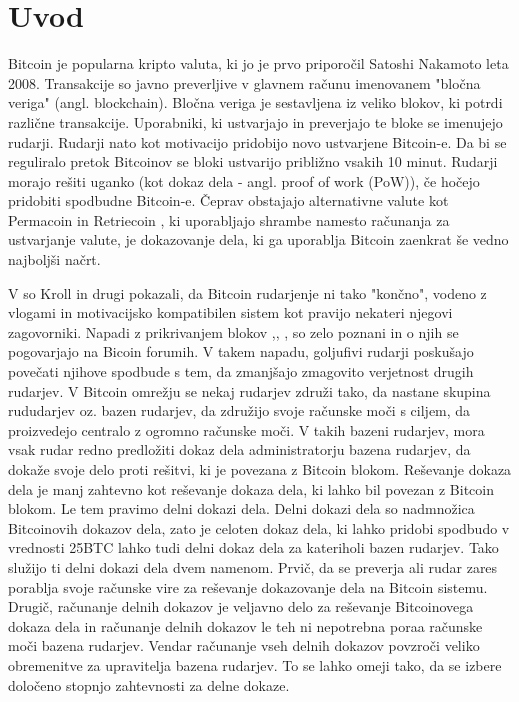 \documentclass[12pt]{article}
\begin{document}
\section{Uvod}
Bitcoin je popularna kripto valuta, ki jo je prvo priporočil Satoshi Nakamoto \cite{nakamoto} leta 2008. Transakcije so javno preverljive v glavnem računu imenovanem "bločna veriga" (angl. blockchain). Bločna veriga je sestavljena iz veliko blokov, ki potrdi različne transakcije. Uporabniki, ki ustvarjajo in preverjajo te bloke se imenujejo rudarji. Rudarji nato kot motivacijo pridobijo novo ustvarjene Bitcoin-e. Da bi se reguliralo pretok Bitcoinov se bloki ustvarijo približno vsakih 10 minut. Rudarji morajo rešiti uganko (kot dokaz dela - angl. proof of work (PoW)), če hočejo pridobiti spodbudne Bitcoin-e. Čeprav obstajajo alternativne valute kot Permacoin \cite{permacoin} in Retriecoin \cite{retriecoin}, ki uporabljajo shrambe namesto računanja za ustvarjanje valute, je dokazovanje dela, ki ga uporablja Bitcoin zaenkrat še vedno najboljši načrt.

 V \cite{economicsofbitcoin} so Kroll  in drugi pokazali, da Bitcoin rudarjenje ni tako "končno", vodeno z vlogami in motivacijsko kompatibilen sistem kot pravijo nekateri njegovi zagovorniki. Napadi z prikrivanjem blokov \cite{analysisofbitcoin},\cite{financialcryptography}, \cite{minnersdilemma}, \cite{powersplitting} so zelo poznani in o njih se pogovarjajo na Bicoin forumih. V takem napadu, goljufivi rudarji poskušajo povečati njihove spodbude s tem, da zmanjšajo zmagovito verjetnost drugih rudarjev. V Bitcoin omrežju se nekaj rudarjev združi tako, da nastane skupina rududarjev oz. bazen rudarjev, da združijo svoje računske moči s ciljem, da proizvedejo centralo z ogromno računske moči. V takih bazeni rudarjev, mora vsak rudar redno predložiti dokaz dela administratorju bazena rudarjev, da dokaže svoje delo proti rešitvi, ki je povezana z Bitcoin blokom. Reševanje dokaza dela je manj zahtevno kot reševanje dokaza dela, ki lahko bil povezan z Bitcoin blokom. Le tem pravimo delni dokazi dela. Delni dokazi dela so nadmnožica Bitcoinovih dokazov dela, zato je celoten dokaz dela, ki lahko pridobi spodbudo v vrednosti 25BTC lahko tudi delni dokaz dela za kateriholi bazen rudarjev. Tako  služijo ti delni dokazi dela dvem namenom. Prvič, da se preverja ali rudar zares porablja svoje računske vire za reševanje dokazovanje dela na Bitcoin sistemu. Drugič, računanje delnih dokazov je veljavno delo za reševanje Bitcoinovega dokaza dela in računanje delnih dokazov le teh ni nepotrebna poraa računske moči bazena rudarjev. Vendar računanje vseh delnih dokazov povzroči veliko obremenitve za upravitelja bazena rudarjev. To se lahko omeji tako, da se izbere določeno stopnjo zahtevnosti za delne dokaze.
\end{document}
